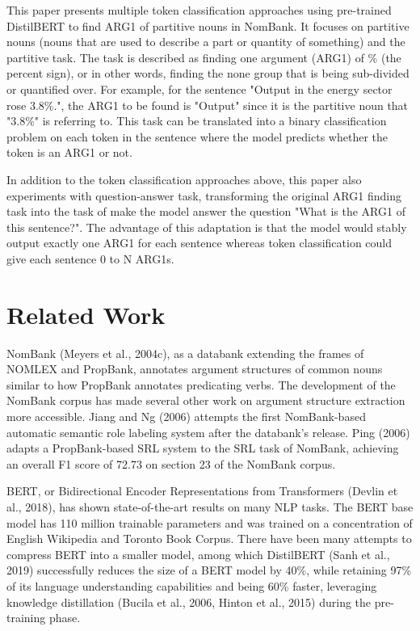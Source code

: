 \documentclass[11pt]{article}
\begin{document}
This paper presents multiple token classification approaches using pre-trained DistilBERT to find ARG1 of partitive nouns in NomBank. It focuses on partitive nouns (nouns that are used to describe a part or quantity of something) and the partitive task. The task is described as finding one argument (ARG1) of \% (the percent sign), or in other words, finding the none group that is being sub-divided or quantified over. For example, for the sentence "Output in the energy sector rose 3.8\%.", the ARG1 to be found is "Output" since it is the partitive noun that "3.8\%" is referring to. This task can be translated into a binary classification problem on each token in the sentence where the model predicts whether the token is an ARG1 or not.

In addition to the token classification approaches above, this paper also experiments with question-answer task, transforming the original ARG1 finding task into the task of make the model answer the question "What is the ARG1 of this sentence?". The advantage of this adaptation is that the model would stably output exactly one ARG1 for each sentence whereas token classification could give each sentence 0 to N ARG1s.


\section{Related Work}

NomBank (Meyers et al., 2004c), as a databank extending the frames of NOMLEX and PropBank, annotates argument structures of common nouns similar to how PropBank annotates predicating verbs. The development of the NomBank corpus has made several other work on argument structure extraction more accessible. Jiang and Ng (2006) attempts the first NomBank-based automatic semantic role labeling system after the databank's release. Ping (2006)  adapts a PropBank-based SRL system to the SRL task of NomBank, achieving an overall F1 score of 72.73 on section 23 of the NomBank corpus.

BERT, or Bidirectional Encoder Representations from Transformers (Devlin et al., 2018), has shown state-of-the-art results on many NLP tasks. The BERT base model has 110 million trainable parameters and was trained on a concentration of English Wikipedia and Toronto Book Corpus. There have been many attempts to compress BERT into a smaller model, among which DistilBERT (Sanh et al., 2019) successfully reduces the size of a BERT model by 40\%, while retaining 97\% of its language understanding capabilities and being 60\% faster, leveraging  knowledge distillation (Bucila et al., 2006, Hinton et al., 2015) during the pre-training phase.
\end{document}
